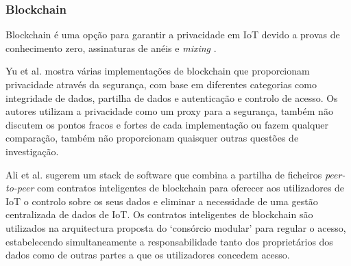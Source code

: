 \documentclass[conference]{IEEEtran}
\begin{document}
\subsubsection{Blockchain}

Blockchain é uma opção para garantir a privacidade em IoT devido a provas de
conhecimento zero, assinaturas de anéis e \textit{mixing} \cite{PrivacyblockchainWikipedia}.


Yu et al. \cite{yu2018blockchain} mostra várias implementações de blockchain
que proporcionam privacidade através da segurança, com base em diferentes
categorias como integridade de dados, partilha de dados e autenticação e controlo
de acesso. Os autores utilizam a privacidade como um proxy para a segurança,
também não discutem os pontos fracos e fortes de cada implementação ou fazem
qualquer comparação, também não proporcionam quaisquer outras questões de investigação.


Ali et al. \cite{AliIoT} sugerem um stack de software que combina a partilha
de ficheiros \textit{peer-to-peer} com contratos inteligentes de blockchain
para oferecer aos utilizadores de IoT o controlo sobre os seus dados e eliminar
a necessidade de uma gestão centralizada de dados de IoT. Os contratos inteligentes
de blockchain são utilizados na arquitectura proposta do `consórcio modular'
para regular o acesso, estabelecendo simultaneamente a responsabilidade tanto
dos proprietários dos dados como de outras partes a que os utilizadores concedem
acesso.

\end{document}

